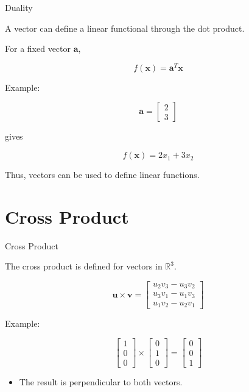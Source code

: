 \documentclass[aspectratio=169]{beamer}
\begin{document}
\begin{frame}{Duality}
\small

A vector can define a linear functional through the dot product.

For a fixed vector $\mathbf{a}$,

$$
f(\mathbf{x})=\mathbf{a}^{T}\mathbf{x}
$$

Example:

$$
\mathbf{a}=
\begin{bmatrix}
2\\
3
\end{bmatrix}
$$

gives

$$
f(\mathbf{x})=2x_1+3x_2
$$

Thus, vectors can be used to define linear functions.

\end{frame}

\section{Cross Product}

\begin{frame}{Cross Product}
\small

The cross product is defined for vectors in $\mathbb{R}^3$.

$$
\mathbf{u}\times\mathbf{v}
=
\begin{bmatrix}
u_2v_3-u_3v_2\\
u_3v_1-u_1v_3\\
u_1v_2-u_2v_1
\end{bmatrix}
$$

Example:

$$
\begin{bmatrix}
1\\
0\\
0
\end{bmatrix}
\times
\begin{bmatrix}
0\\
1\\
0
\end{bmatrix}
=
\begin{bmatrix}
0\\
0\\
1
\end{bmatrix}
$$

\begin{itemize}
\item The result is perpendicular to both vectors.
\end{itemize}

\end{frame}
\end{document}

